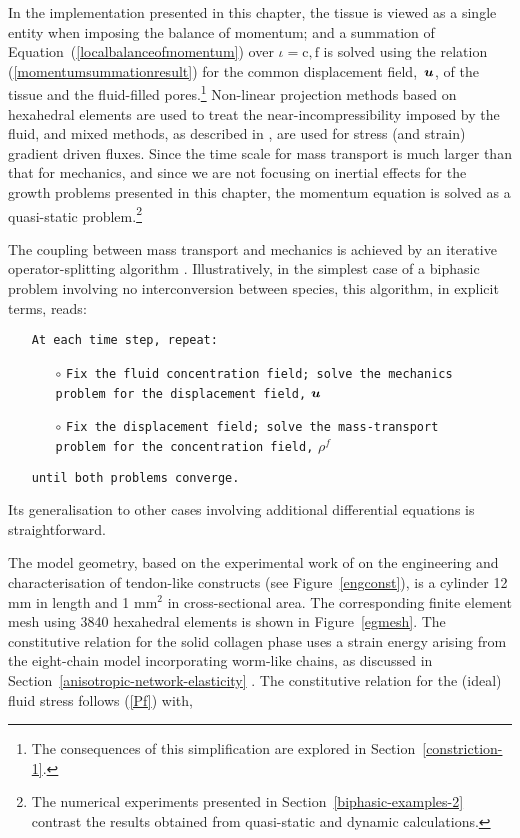 In the implementation presented in this chapter, the tissue is viewed
as a single entity when imposing the balance of momentum; and a
summation of Equation~(\ref{localbalanceofmomentum}) over
$\iota=\mathrm{c,f}$ is solved using the relation
(\ref{momentumsummationresult}) for the common displacement
\mbox{field, $\mbox{\boldmath$ u$}$,} of the tissue and the fluid-filled
pores.\footnote{The consequences of this simplification are explored
  in Section~\ref{constriction-1}.} Non-linear projection methods
\citep{simotaylorpister:85} based on hexahedral elements are used to
treat the near-incompressibility imposed by the fluid, and mixed
methods, as described in \cite{Garikipatiox2:01}, are used for stress
(and strain) gradient driven fluxes. Since the time scale for mass
transport is much larger than that for mechanics, and since we are not
focusing on inertial effects for the growth problems presented in this
chapter, the momentum equation is solved as a quasi-static
problem.\footnote{The numerical experiments presented in
  Section~\ref{biphasic-examples-2} contrast the results obtained from
  quasi-static and dynamic calculations.}

The coupling between mass transport and mechanics is achieved by an
iterative operator-splitting algorithm
\citep{Armero-poroplasticity:99, Garikipatietal:01}. Illustratively,
in the simplest case of a biphasic problem involving no
interconversion between species, this algorithm, in explicit terms,
reads:

\begin{itemize}
\item[] {\tt At each time step, repeat:}
  \begin{itemize}
  \item[$\circ$] {\tt Fix the fluid concentration field; solve the
    mechanics\\ problem for the displacement field,} $\mbox{\boldmath$ u$}$
  \item[$\circ$] {\tt Fix the displacement field; solve the
    mass-transport\\ problem for the concentration field,} $\rho^f$
  \end{itemize}
\item[]{\tt until both problems converge.}
\end{itemize}

\noindent Its generalisation to other cases involving additional
differential equations is straightforward.

The model geometry, based on the experimental work of \citet{Calve:04}
on the engineering and characterisation of tendon-like constructs (see
Figure~\ref{engconst}), is a cylinder 12 mm in length and 1 mm$^2$ in
cross-sectional area. The corresponding finite element mesh using 3840
hexahedral elements is shown in Figure~\ref{egmesh}. The constitutive
relation for the solid collagen phase uses a strain energy arising
from the eight-chain model incorporating worm-like chains, as
discussed in Section~\ref{anisotropic-network-elasticity} . The
constitutive relation for the (ideal) fluid stress follows (\ref{Pf})
with,


